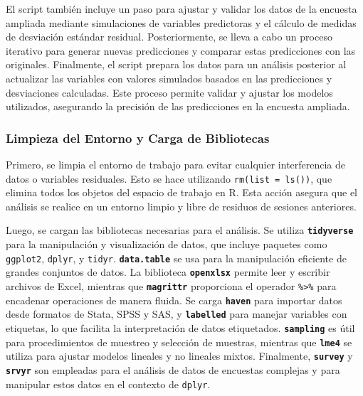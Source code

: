 \documentclass[
  12pt,
]{book}
\begin{document}
El script también incluye un paso para ajustar y validar los datos de la encuesta ampliada mediante simulaciones de variables predictoras y el cálculo de medidas de desviación estándar residual. Posteriormente, se lleva a cabo un proceso iterativo para generar nuevas predicciones y comparar estas predicciones con las originales. Finalmente, el script prepara los datos para un análisis posterior al actualizar las variables con valores simulados basados en las predicciones y desviaciones calculadas. Este proceso permite validar y ajustar los modelos utilizados, asegurando la precisión de las predicciones en la encuesta ampliada.

\hypertarget{limpieza-del-entorno-y-carga-de-bibliotecas-8}{%
\subsubsection*{Limpieza del Entorno y Carga de Bibliotecas}\label{limpieza-del-entorno-y-carga-de-bibliotecas-8}}

Primero, se limpia el entorno de trabajo para evitar cualquier interferencia de datos o variables residuales. Esto se hace utilizando \texttt{rm(list\ =\ ls())}, que elimina todos los objetos del espacio de trabajo en R. Esta acción asegura que el análisis se realice en un entorno limpio y libre de residuos de sesiones anteriores.

Luego, se cargan las bibliotecas necesarias para el análisis. Se utiliza \textbf{\texttt{tidyverse}} para la manipulación y visualización de datos, que incluye paquetes como \texttt{ggplot2}, \texttt{dplyr}, y \texttt{tidyr}. \textbf{\texttt{data.table}} se usa para la manipulación eficiente de grandes conjuntos de datos. La biblioteca \textbf{\texttt{openxlsx}} permite leer y escribir archivos de Excel, mientras que \textbf{\texttt{magrittr}} proporciona el operador \texttt{\%\textgreater{}\%} para encadenar operaciones de manera fluida. Se carga \textbf{\texttt{haven}} para importar datos desde formatos de Stata, SPSS y SAS, y \textbf{\texttt{labelled}} para manejar variables con etiquetas, lo que facilita la interpretación de datos etiquetados. \textbf{\texttt{sampling}} es útil para procedimientos de muestreo y selección de muestras, mientras que \textbf{\texttt{lme4}} se utiliza para ajustar modelos lineales y no lineales mixtos. Finalmente, \textbf{\texttt{survey}} y \textbf{\texttt{srvyr}} son empleadas para el análisis de datos de encuestas complejas y para manipular estos datos en el contexto de \texttt{dplyr}.
\end{document}
